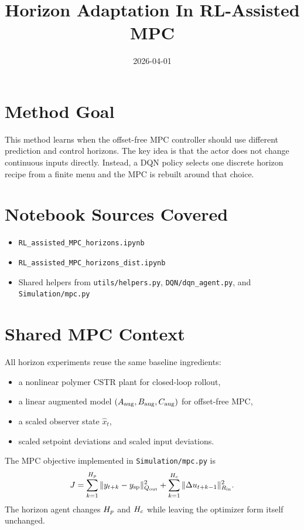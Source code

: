 \documentclass[11pt]{article}
\title{Horizon Adaptation In RL-Assisted MPC}
\date{2026-04-01}
\begin{document}
\maketitle

\section*{Method Goal}

This method learns when the offset-free MPC controller should use different
prediction and control horizons. The key idea is that the actor does not change
continuous inputs directly. Instead, a DQN policy selects one discrete horizon
recipe from a finite menu and the MPC is rebuilt around that choice.

\section*{Notebook Sources Covered}

\begin{itemize}
\item \texttt{RL\_assisted\_MPC\_horizons.ipynb}
\item \texttt{RL\_assisted\_MPC\_horizons\_dist.ipynb}
\item Shared helpers from \texttt{utils/helpers.py}, \texttt{DQN/dqn\_agent.py},
      and \texttt{Simulation/mpc.py}
\end{itemize}

\section*{Shared MPC Context}

All horizon experiments reuse the same baseline ingredients:

\begin{itemize}
\item a nonlinear polymer CSTR plant for closed-loop rollout,
\item a linear augmented model $(A_{\mathrm{aug}}, B_{\mathrm{aug}}, C_{\mathrm{aug}})$ for offset-free MPC,
\item a scaled observer state $\hat{x}_{t}$,
\item scaled setpoint deviations and scaled input deviations.
\end{itemize}

The MPC objective implemented in \texttt{Simulation/mpc.py} is
\[
J = \sum_{k=1}^{H_p} \| y_{t+k} - y_{\mathrm{sp}} \|_{Q_{\mathrm{out}}}^2
  + \sum_{k=1}^{H_c} \| \Delta u_{t+k-1} \|_{R_{\mathrm{in}}}^2.
\]
The horizon agent changes $H_p$ and $H_c$ while leaving the optimizer form
itself unchanged.
\end{document}
